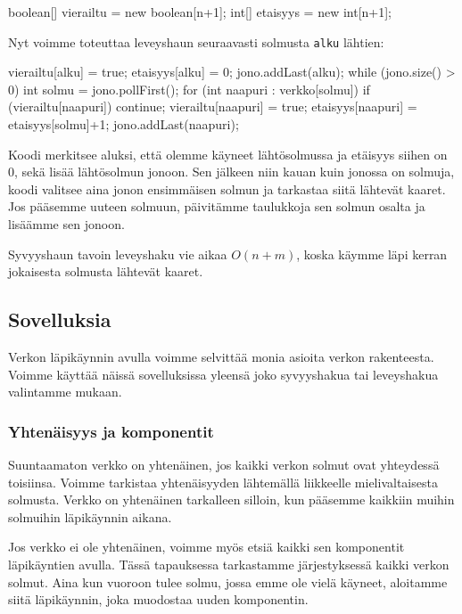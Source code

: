 \begin{code}
boolean[] vierailtu = new boolean[n+1];
int[] etaisyys = new int[n+1];
\end{code}

Nyt voimme toteuttaa leveyshaun seuraavasti solmusta \texttt{alku} lähtien:

\begin{code}
vierailtu[alku] = true;
etaisyys[alku] = 0;
jono.addLast(alku);
while (jono.size() > 0) {
    int solmu = jono.pollFirst();
    for (int naapuri : verkko[solmu]) {
        if (vierailtu[naapuri]) continue;
        vierailtu[naapuri] = true;
        etaisyys[naapuri] = etaisyys[solmu]+1;
        jono.addLast(naapuri);
    }
}
\end{code}

Koodi merkitsee aluksi, että olemme käyneet lähtösolmussa
ja etäisyys siihen on 0, sekä lisää lähtösolmun jonoon.
Sen jälkeen niin kauan kuin jonossa on solmuja,
koodi valitsee aina jonon ensimmäisen solmun
ja tarkastaa siitä lähtevät kaaret.
Jos pääsemme uuteen solmuun, päivitämme taulukkoja
sen solmun osalta ja lisäämme sen jonoon.

Syvyyshaun tavoin leveyshaku vie aikaa $O(n+m)$,
koska käymme läpi kerran jokaisesta solmusta lähtevät kaaret.

\subsection{Sovelluksia}

Verkon läpikäynnin avulla voimme selvittää monia asioita
verkon rakenteesta.
Voimme käyttää näissä sovelluksissa yleensä joko
syvyyshakua tai leveyshakua valintamme mukaan.

\subsubsection{Yhtenäisyys ja komponentit}

Suuntaamaton verkko on yhtenäinen, jos kaikki verkon solmut
ovat yhteydessä toisiinsa.
Voimme tarkistaa yhtenäisyyden lähtemällä liikkeelle
mielivaltaisesta solmusta.
Verkko on yhtenäinen tarkalleen silloin,
kun pääsemme kaikkiin muihin solmuihin läpikäynnin aikana.

Jos verkko ei ole yhtenäinen, voimme myös etsiä kaikki sen
komponentit läpikäyntien avulla.
Tässä tapauksessa tarkastamme järjestyksessä kaikki verkon solmut.
Aina kun vuoroon tulee solmu, jossa emme ole vielä käyneet,
aloitamme siitä läpikäynnin, joka muodostaa uuden komponentin.


